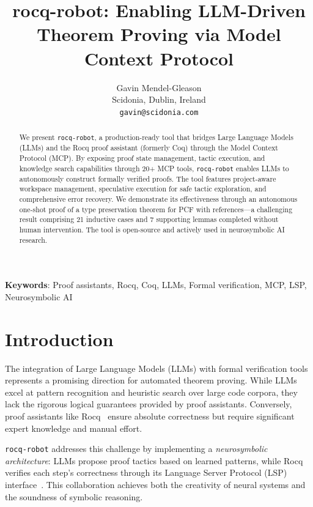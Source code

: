\documentclass[11pt,a4paper]{article}
\newcommand{\tool}{\texttt{rocq-robot}\xspace}
\begin{document}
\title{rocq-robot: Enabling LLM-Driven Theorem Proving via Model Context Protocol}

\author{Gavin Mendel-Gleason\\
Scidonia, Dublin, Ireland\\
\texttt{gavin@scidonia.com}}

\maketitle

\begin{abstract}
We present \tool, a production-ready tool that bridges Large Language Models (LLMs) and the Rocq proof assistant (formerly Coq) through the Model Context Protocol (MCP). By exposing proof state management, tactic execution, and knowledge search capabilities through 20+ MCP tools, \tool enables LLMs to autonomously construct formally verified proofs. The tool features project-aware workspace management, speculative execution for safe tactic exploration, and comprehensive error recovery. We demonstrate its effectiveness through an autonomous one-shot proof of a type preservation theorem for PCF with references—a challenging result comprising 21 inductive cases and 7 supporting lemmas completed without human intervention. The tool is open-source and actively used in neurosymbolic AI research.
\end{abstract}

\noindent\textbf{Keywords}: Proof assistants, Rocq, Coq, LLMs, Formal verification, MCP, LSP, Neurosymbolic AI

\section{Introduction}

The integration of Large Language Models (LLMs) with formal verification tools represents a promising direction for automated theorem proving. While LLMs excel at pattern recognition and heuristic search over large code corpora, they lack the rigorous logical guarantees provided by proof assistants. Conversely, proof assistants like Rocq~\cite{coq} ensure absolute correctness but require significant expert knowledge and manual effort.

\tool addresses this challenge by implementing a \emph{neurosymbolic architecture}: LLMs propose proof tactics based on learned patterns, while Rocq verifies each step's correctness through its Language Server Protocol (LSP) interface~\cite{gallego2022coqlsp}. This collaboration achieves both the creativity of neural systems and the soundness of symbolic reasoning.
\end{document}
